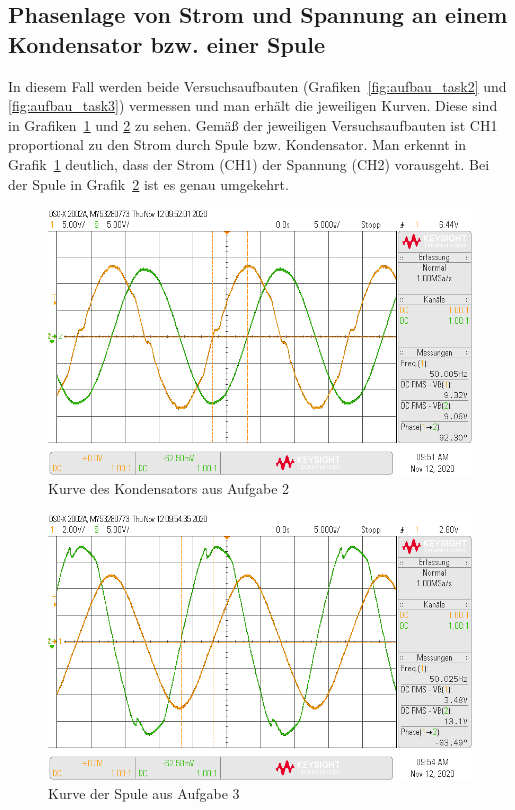 \documentclass{article}
\begin{document}
\subsection{Phasenlage von Strom und Spannung an einem Kondensator bzw. einer Spule}

In diesem Fall werden beide Versuchsaufbauten (Grafiken~\ref{fig:aufbau_task2} und \ref{fig:aufbau_task3}) vermessen und man erhält die jeweiligen Kurven. Diese sind in Grafiken~\ref{fig:task2_kurve} und \ref{fig:task3_kurve} zu sehen. Gemäß der jeweiligen Versuchsaufbauten ist CH1 proportional zu den Strom durch Spule bzw. Kondensator. Man erkennt in Grafik~\ref{fig:task2_kurve} deutlich, dass der Strom (CH1) der Spannung (CH2) vorausgeht. Bei der Spule in Grafik~\ref{fig:task3_kurve} ist es genau umgekehrt.

\begin{figure}[H]
\centering
\caption{Kurve des Kondensators aus Aufgabe 2}
\label{fig:task2_kurve}
\includegraphics[scale=0.4]{daten/pul_4.png}
\end{figure}

\begin{figure}[H]
\centering
\caption{Kurve der Spule aus Aufgabe 3}
\label{fig:task3_kurve}
\includegraphics[scale=0.4]{daten/pul_5.png}
\end{figure}
\end{document}
